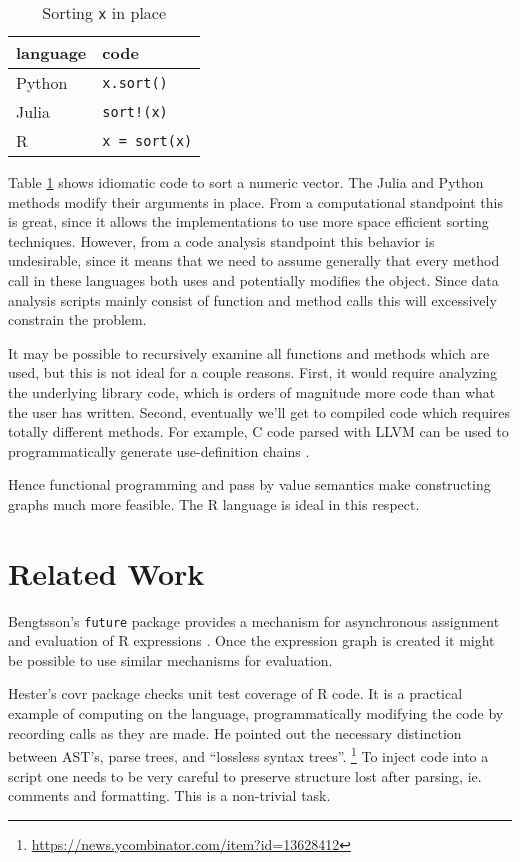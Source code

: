 \documentclass[12pt]{article}
\begin{document}
\begin{table}[]
\centering
    \caption{Sorting \texttt{x} in place}
\label{tab-sort}
\begin{tabular}{ll}
    \textbf{language} & \textbf{code}        \\
\hline
    Python   & \texttt{x.sort()}    \\
    Julia    & \texttt{sort!(x)}    \\
    R        & \texttt{x = sort(x)}
\end{tabular}
\end{table}

Table \ref{tab-sort} shows idiomatic code to sort a numeric vector.
The Julia and Python methods modify their arguments in place.  From a
computational standpoint this is great, since it allows the implementations
to use more space efficient sorting techniques. However, from a code
analysis standpoint this behavior is undesirable, since it means that we
need to assume generally that every method call in these languages both
uses and potentially modifies the object. Since data analysis scripts mainly consist of
function and method calls this will excessively constrain the problem.

It may be possible to recursively examine all functions and methods which
are used, but this is not ideal for a couple reasons. First, it would
require analyzing the underlying library code, which is orders of magnitude
more code than what the user has written. Second, eventually we'll get to
compiled code which requires totally different methods. For example, C code
parsed with LLVM
can be used to programmatically generate use-definition chains
\cite{lattner2004llvm}.

Hence functional programming and pass by value semantics make constructing
graphs much more feasible. The R language is ideal in this respect.

\section{Related Work}

Bengtsson's \texttt{future} package provides a mechanism for
asynchronous assignment and evaluation of R expressions \cite{R-future}. Once the
expression graph is created it might be possible to use similar mechanisms
for evaluation.

Hester's covr package \cite{R-covr} checks unit test coverage of R
code. It is a practical example of computing on the language,
programmatically modifying the code by recording calls as they are made.
He pointed out the necessary distinction between AST's, parse trees, and
``lossless syntax trees''.
\footnote{\url{https://news.ycombinator.com/item?id=13628412}} To inject
code into a script one needs to be very careful to preserve structure lost
after parsing, ie.  comments and formatting. This is a non-trivial task.
\end{document}
